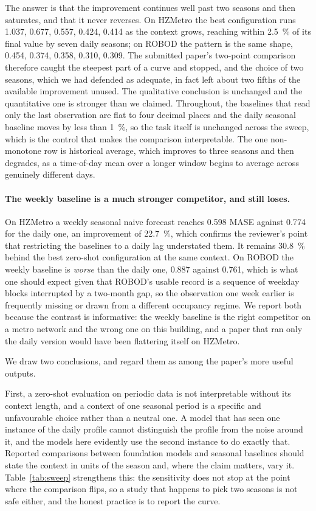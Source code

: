 \documentclass[11pt]{article}
\theoremstyle{plain}
\theoremstyle{definition}
\theoremstyle{remark}
\newif\ifrevisionmarkup
\newcommand{\new}[1]{\ifrevisionmarkup\textcolor{revision}{#1}\else#1\fi}
\begin{document}
\new{The answer is that the improvement continues well past two seasons and then saturates, and that it never reverses. On HZMetro the best configuration runs \num{1.037}, \num{0.677}, \num{0.557}, \num{0.424}, \num{0.414} as the context grows, reaching within \SI{2.5}{\percent} of its final value by seven daily seasons; on ROBOD the pattern is the same shape, \num{0.454}, \num{0.374}, \num{0.358}, \num{0.310}, \num{0.309}. The submitted paper's two-point comparison therefore caught the steepest part of a curve and stopped, and the choice of two seasons, which we had defended as adequate, in fact left about two fifths of the available improvement unused. The qualitative conclusion is unchanged and the quantitative one is stronger than we claimed. Throughout, the baselines that read only the last observation are flat to four decimal places and the daily seasonal baseline moves by less than \SI{1}{\percent}, so the task itself is unchanged across the sweep, which is the control that makes the comparison interpretable. The one non-monotone row is historical average, which improves to three seasons and then degrades, as a time-of-day mean over a longer window begins to average across genuinely different days.}

\new{\paragraph{The weekly baseline is a much stronger competitor, and still loses.} On HZMetro a weekly seasonal naive forecast reaches \num{0.598} MASE against \num{0.774} for the daily one, an improvement of \SI{22.7}{\percent}, which confirms the reviewer's point that restricting the baselines to a daily lag understated them. It remains \SI{30.8}{\percent} behind the best zero-shot configuration at the same context. On ROBOD the weekly baseline is \emph{worse} than the daily one, \num{0.887} against \num{0.761}, which is what one should expect given that ROBOD's usable record is a sequence of weekday blocks interrupted by a two-month gap, so the observation one week earlier is frequently missing or drawn from a different occupancy regime. We report both because the contrast is informative: the weekly baseline is the right competitor on a metro network and the wrong one on this building, and a paper that ran only the daily version would have been flattering itself on HZMetro.}

We draw two conclusions, and regard them as among the paper's more useful outputs.

First, a zero-shot evaluation on periodic data is not interpretable without its context length, and a context of one seasonal period is a specific and unfavourable choice rather than a neutral one. A model that has seen one instance of the daily profile cannot distinguish the profile from the noise around it, and the models here evidently use the second instance to do exactly that. Reported comparisons between foundation models and seasonal baselines should state the context in units of the season and, where the claim matters, vary it. \new{Table~\ref{tab:sweep} strengthens this: the sensitivity does not stop at the point where the comparison flips, so a study that happens to pick two seasons is not safe either, and the honest practice is to report the curve.}
\end{document}
